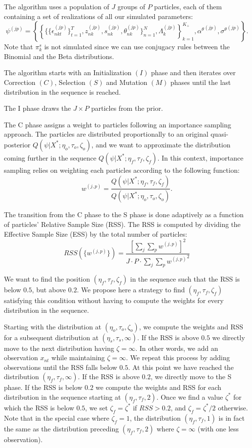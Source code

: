 \documentclass[12pt]{article}
\newcounter{thm}[section]
\begin{document}
The algorithm uses a population of $J$ groups of $P$ particles, each of them containing a set of realizations of all our simulated parameters: $$\psi^{(jp)} = \left\{ \left\{ \{\{\epsilon_{nkt}^{(jp)}\}_{t=1}^T, z_{nk}^{(jp)},s_{nk}^{(jp)}, \theta_{nk}^{(jp)} \}_{n=1}^N, \Lambda_{k}^{(jp)} \right\}_{k=1}^{K_+},{\alpha^\theta}^{(jp)}, {\sigma^\theta}^{(jp)} \right\}.$$
Note that ${\pi_k^s}$ is not simulated since we can use conjugacy rules between the Binomial and the Beta distributions.

The algorithm starts with an Initialization $(I)$ phase and then iterates over Correction $(C)$, Selection $(S)$ and Mutation $(M)$ phases until the last distribution in the sequence is reached. 

The I phase draws the $J\times P$ particles from the prior.

The C phase assigns a weight to particles following an importance sampling approach. The particles are distributed proportionally to an original quasi-posterior $Q(\psi|X^*;\eta_o,\tau_o,\zeta_o)$, and we want to approximate the distribution coming further in the sequence $Q(\psi|X^*; \eta_f,\tau_f,\zeta_f)$. In this context, importance sampling relies on weighting each particles according to the following function:
$$ w^{(j,p)} = \frac{Q(\psi|X^*;\eta_f,\tau_f,\zeta_f)}{Q(\psi|X^*;\eta_o,\tau_o,\zeta_o)}.$$

The transition from the C phase to the S phase is done adaptively as a function of particles' Relative Sample Size (RSS). The RSS is computed by dividing the Effective Sample Size (ESS) by the total number of particles:
$$ RSS(\{ w^{(j,p)}\}) = \frac{[\sum_j \sum_p  w^{(j,p)} ]^2}{ J \cdot P \cdot \sum_j \sum_p  {w^{(j,p)}}^2 } $$

We want to find the position $(\eta_f,\tau_f,\zeta_f)$ in the sequence such that the RSS is below $0.5$, but above $0.2$. We propose here a strategy to find $(\eta_f,\tau_f,\zeta_f)$ satisfying this condition without having to compute the weights for every distribution in the sequence.

Starting with the distribution at $(\eta_o,\tau_o,\zeta_o)$, we compute the weights and RSS for a subsequent distribution at $(\eta_s,\tau_s,\infty)$. If the RSS is above $0.5$ we directly move to the next distribution having $\zeta=\infty$. In other words, we add an observation $x_{nt}$ while maintaining $\zeta=\infty$. We repeat this process by adding observations until the RSS falls below $0.5$. At this point we have reached the distribution $(\eta_f,\tau_f,\infty)$. If the RSS is above $0.2$, we directly move to the S phase. If the RSS is below $0.2$ we compute the weights and RSS for each distribution in the sequence starting at $(\eta_f,\tau_f,2)$. Once we find a value $\zeta^*$ for which the RSS is below $0.5$, we set $\zeta_f=\zeta^*$ if $RSS > 0.2$, and $\zeta_f=\zeta^*/2$ otherwise. Note that in the special case where $\zeta_f=1$, the distribution $(\eta_f,\tau_f,1)$ is in fact the same as the distribution preceding $(\eta_f,\tau_f,2)$ where $\zeta=\infty$ (with one less observation).
\end{document}
